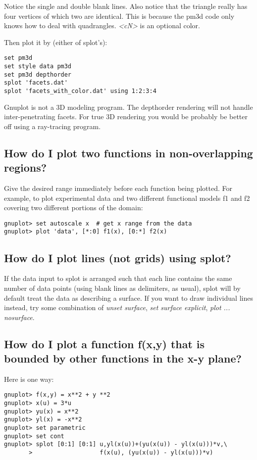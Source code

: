 \documentclass[letter,11pt]{article}
\begin{document}
{Notice the single and double blank lines. Also notice that the triangle
really has four vertices of which two are identical.  This is because the
pm3d code only knows how to deal with quadrangles.
\textit{<cN>} is an optional color.

Then plot it by (either of splot's):
\small
\begin{verbatim}
set pm3d
set style data pm3d
set pm3d depthorder
splot 'facets.dat'
splot 'facets_with_color.dat' using 1:2:3:4
\end{verbatim}
\normalsize

Gnuplot is not a 3D modeling program.
The depthorder rendering will not handle inter-penetrating facets.
For true 3D rendering you would be probably be better off using a ray-tracing program.

\subsection{How do I plot two functions in non-overlapping regions?}

Give the desired range immediately before each function being plotted.
For example, to plot experimental data and two different functional
models f1 and f2 covering two different portions of the domain:
\small
\begin{verbatim}
gnuplot> set autoscale x  # get x range from the data
gnuplot> plot 'data', [*:0] f1(x), [0:*] f2(x)
\end{verbatim}
\normalsize


\subsection{How do I plot lines (not grids) using splot?}

If the data input to splot is arranged such that each line contains
the same number of data points (using blank lines as delimiters, as usual),
splot will by default treat the data as describing a surface.
If you want to draw individual lines instead, try some combination of
\textit{unset surface}, \textit{set surface explicit}, \textit{plot ... nosurface}.


\subsection{How do I plot a function f(x,y) that is bounded by other
          functions in the x-y plane?}

Here is one way:
\small
\begin{verbatim}
gnuplot> f(x,y) = x**2 + y **2
gnuplot> x(u) = 3*u
gnuplot> yu(x) = x**2
gnuplot> yl(x) = -x**2
gnuplot> set parametric
gnuplot> set cont
gnuplot> splot [0:1] [0:1] u,yl(x(u))+(yu(x(u)) - yl(x(u)))*v,\
       >                   f(x(u), (yu(x(u)) - yl(x(u)))*v)
\end{verbatim}
\normalsize


}
\end{document}
